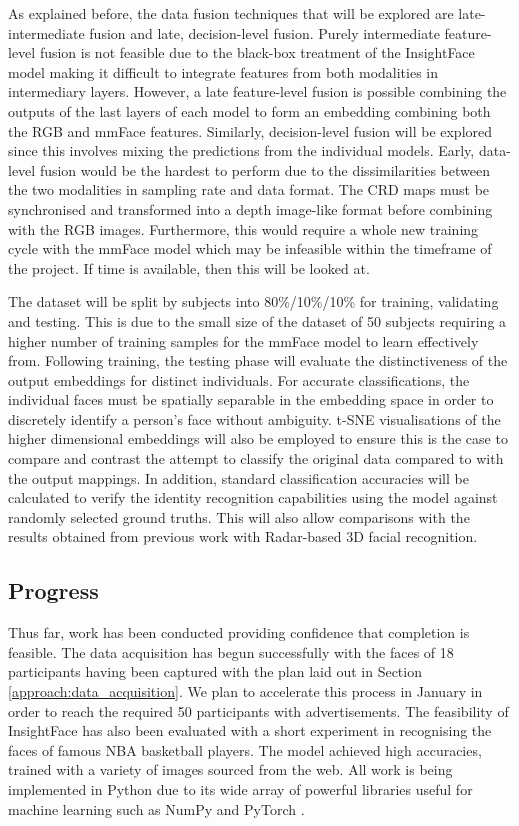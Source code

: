 \documentclass{interim}
\begin{document}
As explained before, the data fusion techniques that will be explored are late-intermediate fusion and late, decision-level fusion. Purely intermediate feature-level fusion is not feasible due to the black-box treatment of the InsightFace model making it difficult to integrate features from both modalities in intermediary layers. However, a late feature-level fusion is possible combining the outputs of the last layers of each model to form an embedding combining both the RGB and mmFace features. Similarly, decision-level fusion will be explored since this involves mixing the predictions from the individual models. Early, data-level fusion would be the hardest to perform due to the dissimilarities between the two modalities in sampling rate and data format. The CRD maps must be synchronised and transformed into a depth image-like format before combining with the RGB images. Furthermore, this would require a whole new training cycle with the mmFace model which may be infeasible within the timeframe of the project. If time is available, then this will be looked at.


The dataset will be split by subjects into 80\%/10\%/10\% for training, validating and testing. This is due to the small size of the dataset of 50 subjects requiring a higher number of training samples for the mmFace model to learn effectively from. Following training, the testing phase will evaluate the distinctiveness of the output embeddings for distinct individuals. For accurate classifications, the individual faces must be spatially separable in the embedding space in order to discretely identify a person's face without ambiguity. t-SNE visualisations \cite{van2008visualizing} of the higher dimensional embeddings will also be employed to ensure this is the case to compare and contrast the attempt to classify the original data compared to with the output mappings. In addition, standard classification accuracies will be calculated to verify the identity recognition capabilities using the model against randomly selected ground truths. This will also allow comparisons with the results obtained from previous work with Radar-based 3D facial recognition.


\subsection{Progress}
\label{approach:progress}
Thus far, work has been conducted providing confidence that completion is feasible. The data acquisition has begun successfully with the faces of 18 participants having been captured with the plan laid out in Section \ref{approach:data_acquisition}. We plan to accelerate this process in January in order to reach the required 50 participants with advertisements. The feasibility of InsightFace has also been evaluated with a short experiment in recognising the faces of famous NBA basketball players. The model achieved high accuracies, trained with a variety of images sourced from the web. All work is being implemented in Python due to its wide array of powerful libraries useful for machine learning such as NumPy \cite{harris2020array} and PyTorch \cite{paszke2019pytorch}.
\end{document}
